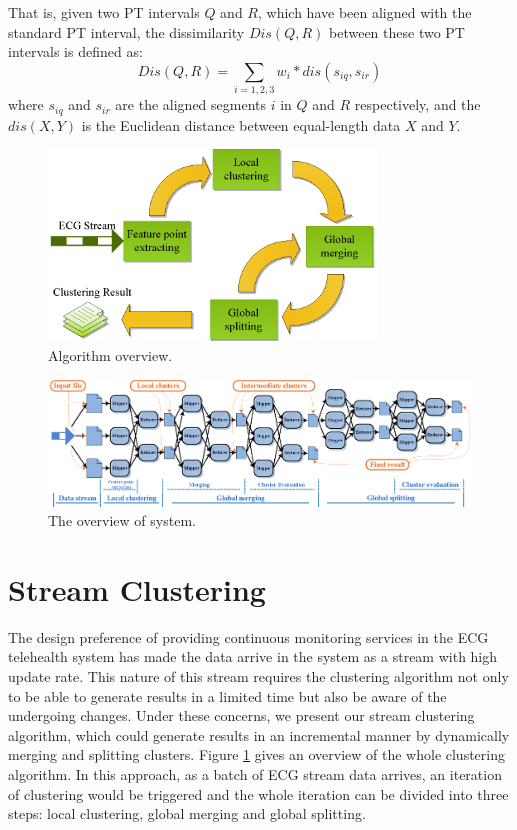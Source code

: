 \documentclass[conference]{IEEEtran}
\begin{document}
That is, given two PT intervals $ Q $ and $ R $, which have been aligned with the standard PT interval, the dissimilarity $ Dis(Q, R) $ between these two PT intervals is defined as:
\begin{equation}\label{eq_dissimilarity}
Dis(Q, R) = \sum_{i=1,2,3}{w_i * dis(s_{iq}, s_{ir} )}
\end{equation}
where $ s_{iq} $ and $ s_{ir} $ are the aligned segments $ i $ in $ Q $ and $ R $ respectively, and the $ dis(X, Y) $ is the Euclidean distance between equal-length data $ X $ and $ Y $.

\begin{figure}[!t]
\centering
\includegraphics[height=2.0in]{./Figure/algorithm_overview.eps}
\caption{Algorithm overview.}
\label{fig_algorithm_overview}
\end{figure}

\begin{figure}[!t]
\centering
\includegraphics[width=7.1in]{./Figure/system_overview.eps}
\caption{The overview of system.}
\label{fig_sys_overview}
\end{figure}
\section{Stream Clustering}
The design preference of providing continuous monitoring services in the ECG telehealth system has made the data arrive in the system as a stream with high update rate. This nature of this stream requires the clustering algorithm not only to be able to generate results in a limited time but also be aware of the undergoing changes. Under these concerns, we present our stream clustering algorithm, which could generate results in an incremental manner by dynamically merging and splitting clusters. Figure \ref{fig_algorithm_overview} gives an overview of the whole clustering algorithm. In this approach, as a batch of ECG stream data arrives, an iteration of clustering would be triggered and the whole iteration can be divided into three steps: local clustering, global merging and global splitting.
\end{document}
